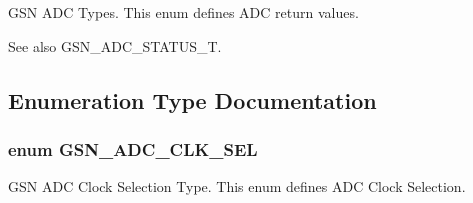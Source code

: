 GSN ADC Types. This enum defines ADC return values. 

\begin{DoxySeeAlso}{See also}
GSN\_\-ADC\_\-STATUS\_\-T. 
\end{DoxySeeAlso}


\subsection{Enumeration Type Documentation}
\hypertarget{a00643_ga2f2a2e534be6515e903852c38803c75f}{
\subsubsection[{GSN\_\-ADC\_\-CLK\_\-SEL}]{\setlength{\rightskip}{0pt plus 5cm}enum {\bf GSN\_\-ADC\_\-CLK\_\-SEL}}}
\label{a00643_ga2f2a2e534be6515e903852c38803c75f}


GSN ADC Clock Selection Type. This enum defines ADC Clock Selection. 


